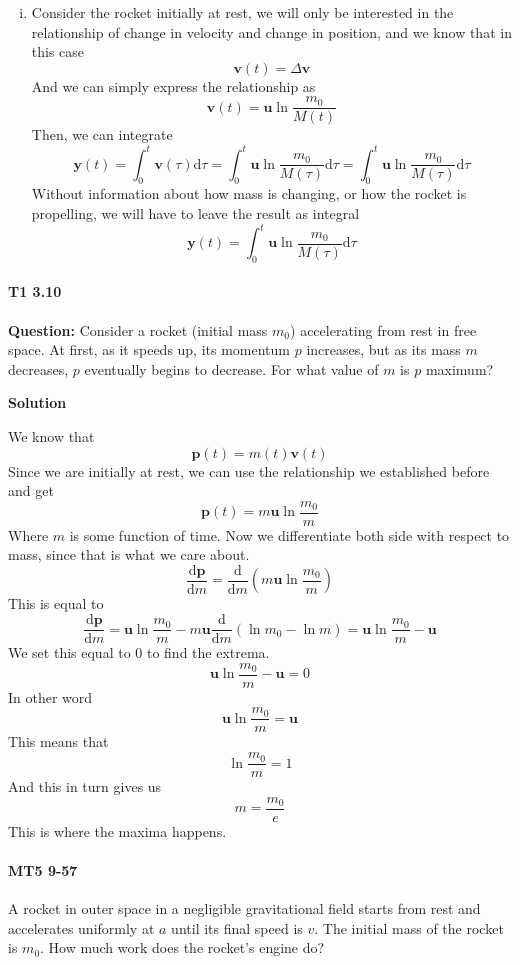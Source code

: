 \documentclass[11pt,letterpaper]{article}
\newcommand{\dydx}[2]{\frac{\text{d} #1}{\text{d} #2}}
\newcommand{\paren}[1]{\left( #1 \right)}
\newcommand{\dfl}{\text{d}}
\begin{document}
\begin{enumerate}[i.]
    \item Consider the rocket initially at rest, we will only be interested in the relationship of change in velocity and change in position, and we know that in this case
    \[
    \mathbf{v}(t) = \Delta\mathbf{v}
    \]
    And we can simply express the relationship as
    \[
    \mathbf{v}(t) = \mathbf{u}\ln\frac{m_0}{M(t)}
    \]
    Then, we can integrate
    \[
    \mathbf{y}(t) = \int_{0}^{t} \mathbf{v}(\tau)\dfl \tau = \int_{0}^{t}\mathbf{u}\ln\frac{m_0}{M(\tau)}\dfl \tau = \int_{0}^{t}\mathbf{u}\ln\frac{m_0}{M(\tau)}\dfl\tau
    \]
    Without information about how mass is changing, or how the rocket is propelling, we will have to leave the result as integral
    \[
    \mathbf{y}(t) = \int_{0}^{t}\mathbf{u}\ln\frac{m_0}{M(\tau)}\dfl\tau
    \]
\end{enumerate}
\paragraph{T1 3.10}
\textbf{Question:} Consider a rocket (initial mass $m_0$) accelerating from rest in free space. At first, as it speeds up, its momentum $p$ increases, but as its mass $m$ decreases, $p$ eventually begins to decrease. For what value of $m$ is $p$ maximum?

\textbf{Solution}

We know that
\[
\mathbf{p}(t) = m(t)\mathbf{v}(t)
\]
Since we are initially at rest, we can use the relationship we established before and get
\[
\mathbf{p}(t) = m\mathbf{u}\ln\frac{m_0}{m}
\]
Where $m$ is some function of time. Now we differentiate both side with respect to mass, since that is what we care about.
\[
\dydx{\mathbf{p}}{m} = \dydx{}{m}\paren{ m\mathbf{u}\ln\frac{m_0}{m}}
\]
This is equal to
\[
\dydx{\mathbf{p}}{m}  = \mathbf{u}\ln\frac{m_0}{m} - m\mathbf{u}\dydx{}{m}\paren{\ln m_0 - \ln m} = \mathbf{u}\ln\frac{m_0}{m} - \mathbf{u}
\]
We set this equal to $0$ to find the extrema. 
\[
\mathbf{u}\ln\frac{m_0}{m} - \mathbf{u} = 0
\]
In other word
\[
\mathbf{u}\ln\frac{m_0}{m} = \mathbf{u}
\]
This means that
\[
\ln\frac{m_0}{m} = 1
\]
And this in turn gives us
\[
m = \frac{m_0}{e}
\]
This is where the maxima happens. 



\paragraph{MT5 9-57}
A rocket in outer space in a negligible gravitational field starts from rest and accelerates uniformly at $a$ until its final speed is $v$. The initial mass of the rocket is $m_0$. How much work does the rocket’s engine do?
\end{document}
